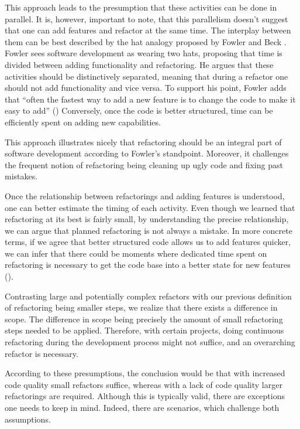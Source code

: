 This approach leads to the presumption that these activities can be done in parallel.
It is, however, important to note, 
	that this parallelism doesn't suggest that one can add features and refactor at the same time.
The interplay between them can be best described by the hat analogy proposed by Fowler and Beck \textcite[p.~47]{fowler2018}. 
Fowler sees software development as wearing two hats, 
	proposing that time is divided between adding functionality and refactoring. 
He argues that these activities should be distinctively separated, 
	meaning that during a refactor one should not add functionality and vice versa. 
To support his point, 
	Fowler adds that “often the fastest way to add a new feature is to change the code to make it easy to add” (\cite[p.~53]{fowler2018}) 
Conversely, once the code is better structured, 
	time can be efficiently spent on adding new capabilities.

This approach illustrates nicely that refactoring 
	should be an integral part of software development according to Fowler's standpoint.  
Moreover, it challenges the frequent notion of refactoring being 
	cleaning up ugly code and fixing past mistakes. 

Once the relationship between refactorings and adding features is understood, 
	one can better estimate the timing of each activity.
Even though we learned that refactoring at its best is fairly small, 
	by understanding the precise relationship, 
	we can argue that planned refactoring is not always a mistake.
In more concrete terms, if we agree that better structured code 
	allows us to add features quicker, 
	we can infer that there could be moments where dedicated time spent on refactoring 
	is necessary to get the code base into a better state for new features (\cite[p.~53]{fowler2018}).

Contrasting large and potentially complex refactors with our previous definition of 
	refactoring being smaller steps, we realize 
	that there exists a difference in scope.
The difference in scope being precisely 
	the amount of small refactoring steps needed to be applied.
Therefore, with certain projects, doing continuous refactoring during the development process might not suffice, 
	and an overarching refactor is necessary.

According to these presumptions, the conclusion would be 
	that with increased code quality small refactors suffice, 
	whereas with a lack of code quality larger refactorings are required. 
Although this is typically valid, there are exceptions one needs to keep in mind. 
Indeed, there are scenarios, which challenge both assumptions.

